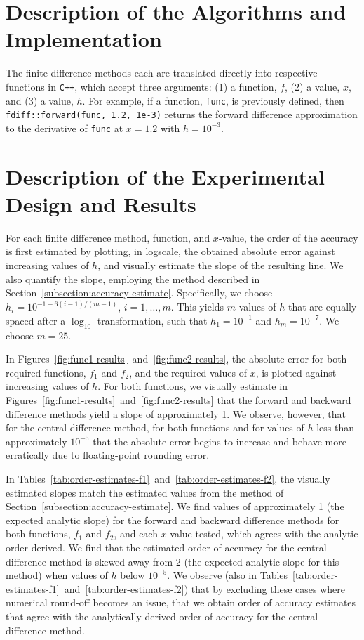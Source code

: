 \documentclass[11pt]{article}
\begin{document}
\section{Description of the Algorithms and Implementation}

The finite difference methods each are translated directly into respective functions in \texttt{C++}, which accept three arguments: (1) a function, $f$, (2) a value, $x$, and (3) a value, $h$. For example, if a function, \texttt{func}, is previously defined, then \texttt{fdiff::forward(func, 1.2, 1e-3)} returns the forward difference approximation to the derivative of \texttt{func} at $x=1.2$ with $h=10^{-3}$.

\section{Description of the Experimental Design and Results}

For each finite difference method, function, and $x$-value, the order of the accuracy is first estimated by plotting, in logscale, the obtained absolute error against increasing values of $h$, and visually estimate the slope of the resulting line. We also quantify the slope, employing the method described in Section~\ref{subsection:accuracy-estimate}. Specifically, we choose $h_i = 10^{-1-6(i-1)/(m-1)}$, $i=1,\ldots, m$. This yields $m$ values of $h$ that are equally spaced after a $\log_{10}$ transformation, such that $h_1 = 10^{-1}$ and $h_m = 10^{-7}$. We choose $m=25$.

In Figures~\ref{fig:func1-results}~and~\ref{fig:func2-results}, the absolute error for both required functions, $f_1$ and $f_2$, and the required values of $x$, is plotted against increasing values of $h$. For both functions, we visually estimate in Figures~\ref{fig:func1-results}~and~\ref{fig:func2-results} that the forward and backward difference methods yield a slope of approximately 1. We observe, however, that for the central difference method, for both functions and for values of $h$ less than approximately $10^{-5}$ that the absolute error begins to increase and behave more erratically due to floating-point rounding error.

In Tables~\ref{tab:order-estimates-f1}~and~\ref{tab:order-estimates-f2}, the visually estimated slopes match the estimated values from the method of Section~\ref{subsection:accuracy-estimate}. We find values of approximately 1 (the expected analytic slope) for the forward and backward difference methods for both functions, $f_1$ and $f_2$, and each $x$-value tested, which agrees with the analytic order derived. We find that the estimated order of accuracy for the central difference method is skewed away from $2$ (the expected analytic slope for this method) when values of $h$ below $10^{-5}$. We observe (also in Tables~\ref{tab:order-estimates-f1}~and~\ref{tab:order-estimates-f2}) that by excluding these cases where numerical round-off becomes an issue, that we obtain order of accuracy estimates that agree with the analytically derived order of accuracy for the central difference method.
\end{document}
